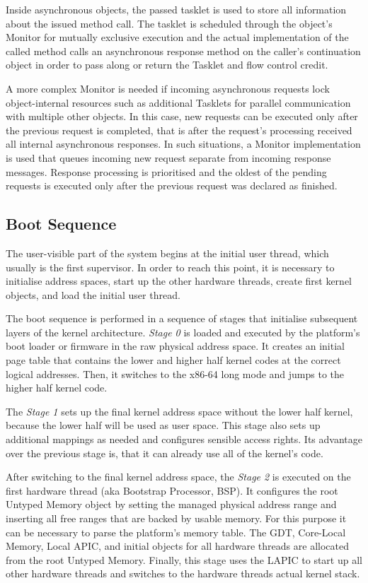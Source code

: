 Inside asynchronous objects, the passed tasklet is used to store all information about the issued method call. The tasklet is scheduled through the object's Monitor for mutually exclusive execution and the actual implementation of the called method calls an asynchronous response method on the caller's continuation object in order to pass along or return the Tasklet and flow control credit.

A more complex Monitor is needed if incoming asynchronous requests lock object-internal resources such as additional Tasklets for parallel communication with multiple other objects. In this case, new requests can be executed only after the previous request is completed, that is after the request's processing received all internal asynchronous responses. In such situations, a Monitor implementation is used that queues incoming new request separate from incoming response messages. Response processing is prioritised and the oldest of the pending requests is executed only after the previous request was declared as finished.     

\subsection{Boot Sequence}
\label{sec:boot-dyn}
The user-visible part of the system begins at the initial user thread, which usually is the first supervisor. In order to reach this point, it is necessary to initialise address spaces, start up the other hardware threads, create first kernel objects, and load the initial user thread.

The boot sequence is performed in a sequence of stages that initialise subsequent layers of the kernel architecture.
%
\emph{Stage 0} is loaded and executed by the platform's boot loader or firmware in the raw physical address space. It creates an initial page table that contains the lower and higher half kernel codes at the correct logical addresses. Then, it switches to the x86-64 long mode and jumps to the higher half kernel code. 

The \emph{Stage 1} sets up the final kernel address space without the lower half kernel, because the lower half will be used as user space. This stage also sets up additional mappings as needed and configures sensible access rights. Its advantage over the previous stage is, that it can already use all of the kernel's code.

After switching to the final kernel address space, the \emph{Stage 2} is executed on the first hardware thread (aka Bootstrap Processor, BSP). It configures the root Untyped Memory object by setting the managed physical address range and inserting all free ranges that are backed by usable memory. For this purpose it can be necessary to parse the platform's memory table. The GDT, Core-Local Memory, Local APIC, and initial objects for all hardware threads are allocated from the root Untyped Memory. Finally, this stage uses the LAPIC to start up all other hardware threads and switches to the hardware threads actual kernel stack.

